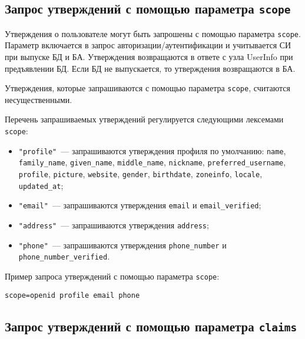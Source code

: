 \label{CLAIMS.ReqWith}

\subsection{Запрос утверждений с помощью параметра \lstinline{scope}} 
\label{CLAIMS.ReqWithScope}

Утверждения о пользователе могут быть запрошены с помощью параметра
\lstinline{scope}. Параметр включается в запрос авторизации/аутентификации 
и учитывается СИ при выпуске БД и БА.
%
Утверждения возвращаются в ответе с узла UserInfo при предъявлении БД. 
%
Если БД не выпускается, то утверждения возвращаются в БА. 

Утверждения, которые запрашиваются с помощью параметра \lstinline{scope},
считаются несущественными.

Перечень запрашиваемых утверждений регулируется следующими лексемами 
\lstinline{scope}: 
\begin{itemize}
\item
\lstinline{"profile"}~--- запрашиваются утверждения профиля по умолчанию: 
\lstinline{name}, 
\lstinline{family_name}, 
\lstinline{given_name}, 
\lstinline{middle_name}, 
\lstinline{nickname},
\lstinline{preferred_username}, 
\lstinline{profile}, 
\lstinline{picture}, 
\lstinline{website}, 
\lstinline{gender}, 
\lstinline{birthdate},
\lstinline{zoneinfo}, 
\lstinline{locale}, 
\lstinline{updated_at};

\item
\lstinline{"email"}~--- 
запрашиваются утверждения
\lstinline{email} и \lstinline{email_verified};

\item
\lstinline{"address"}~--- 
запрашиваются утверждения 
\lstinline{address};

\item
\lstinline{"phone"}~--- 
запрашиваются утверждения
\lstinline{phone_number} и \lstinline{phone_number_verified}.
\end{itemize}

Пример запроса утверждений с помощью параметра \lstinline{scope}:
\begin{lstlisting}
scope=openid profile email phone
\end{lstlisting}

\subsection{Запрос утверждений с помощью параметра \lstinline{claims}}
\label{CLAIMS.ReqWithClaims}

